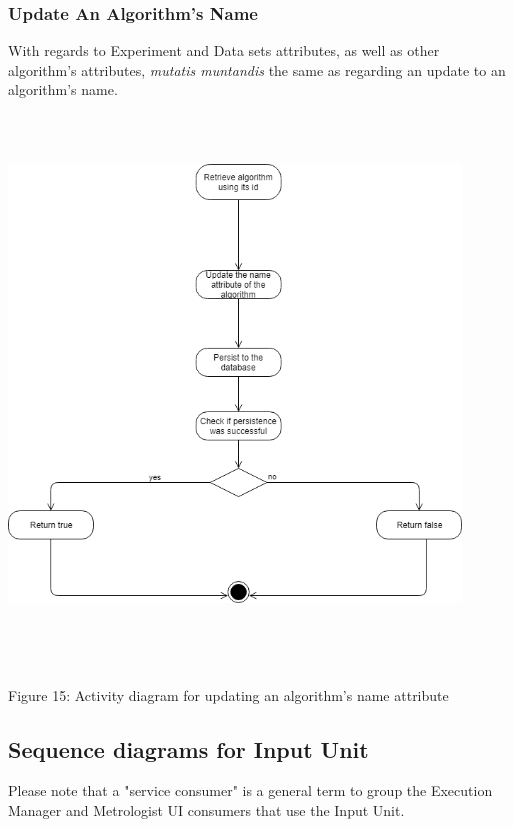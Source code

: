     \subsubsection{Update An Algorithm's Name}
    \par With regards to Experiment and Data sets attributes, as well as other algorithm's attributes,
{\textit{mutatis muntandis} the same as regarding an update to an algorithm's name.} \newline \newline
    \includegraphics[width=12cm,height=15cm,keepaspectratio]{input_unit/images/update_algorithm_activity_diagram.png}
	\begin{center}
	    \small{Figure 15: Activity diagram for updating an algorithm's name attribute }
    \end{center}
	\newpage

\subsection{Sequence diagrams for Input Unit}
	\par{Please note that a "service consumer" is a general term to group the Execution Manager and Metrologist UI consumers that use the Input Unit.}

